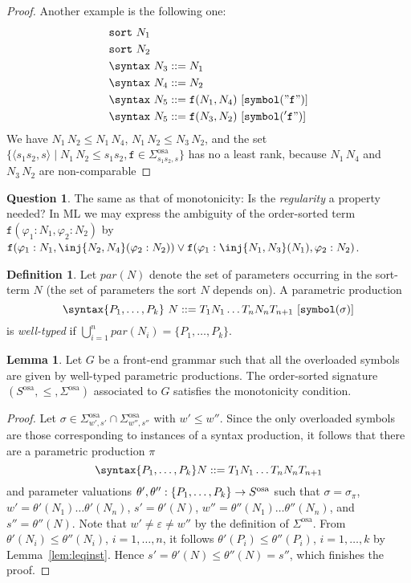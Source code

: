 \documentclass{article}
\theoremstyle{definition}
\theoremstyle{definition}
\theoremstyle{definition}
\newtheorem{definition}{Definition}[section]
\theoremstyle{definition}
\theoremstyle{definition}
\newtheorem{question}{Question}[section]
\theoremstyle{theorem}
\theoremstyle{theorem}
\theoremstyle{theorem}
\newtheorem{lemma}{Lemma}[section]
\theoremstyle{theorem}
\theoremstyle{theorem}
\newcommand{\KWsymbol}{\texttt{symbol}}
\newcommand{\sort}{\texttt{sort}}
\begin{document}
{\begin{proof}
Another example is the following one:
\begin{align*}
&\sort\ N_1\\
&\sort\ N_2\\
&\syntax\ N_3 ::= N_1\\
&\syntax\ N_4 ::= N_2\\
&\syntax\ N_5 ::= \texttt{f}(N_1,N_4)\ [\KWsymbol("\texttt{f}")]\\ 
&\syntax\ N_5 ::= \texttt{f}(N_3,N_2)\ [\KWsymbol('\texttt{f}")]
\end{align*}
We have $N_1\,N_2\le N_1\,N_4$, $N_1\,N_2\le N_3\,N_2$, and the set $\{\langle s_1s_2,s\rangle\mid N_1\,N_2\le s_1s_2, \texttt{f}\in\Sigma^\textrm{osa}_{s_1s_2,s}\}$ has no a least rank, because $N_1\,N_4$ and $N_3\,N_2$ are non-comparable
\end{proof}
\begin{question}
The same as that of monotonicity:
Is the \emph{regularity} a property needed? In ML we may express the ambiguity of the order-sorted term $\texttt{f}(\varphi_1:N_1,\varphi_2:N_2)$ by $\texttt{f}(\varphi_1:N_1,\inj\{N_2,N_4\}(\varphi_2:N_2))\lor\texttt{f}(\varphi_1:\inj\{N_1,N_3\}(N_1),\varphi_2:N_2)$.
\end{question}

\begin{definition}
Let $\mathit{par}(N)$ denote the set of parameters occurring in the sort-term $N$ (the set of parameters the sort $N$ depends on). 
A parametric production
\[\syntax\{P_1,\ldots,P_k\}\ N ::= T_1 N_1 \ldots T_n N_n T_{n+1}\ [\KWsymbol(\sigma)]\]
is \emph{well-typed} if $\bigcup_{i=1}^n\mathit{par}(N_i)=\{P_1,\ldots,P_k\}$.
\end{definition}

\begin{lemma}\label{lem:monotonicity}
Let $G$ be a front-end grammar such that all the overloaded symbols are given by well-typed parametric productions. The order-sorted signature $(S^\textrm{osa},\le, \Sigma^\textrm{osa})$ associated to $G$ satisfies the monotonicity condition.
\end{lemma}
\begin{proof}
Let $\sigma\in \Sigma^\textrm{osa}_{w',s'}\cap \Sigma^\textrm{osa}_{w'',s''}$ with $w'\le w''$.
Since the only overloaded symbols are those corresponding to instances of a syntax production, it follows that there are a parametric production $\pi$
\[
    \syntax\{P\sb{1},\ldots,P\sb{k}\} N ::= T\sb{1}N\sb{1}\ldots T\sb{n}N\sb{n}T\sb{n+1} 
\]
and parameter valuations $\theta',\theta'':\{P\sb{1},\ldots,P\sb{k}\}\to S^\textrm{osa}$  such that $\sigma=\sigma_\pi$, $w'=\theta'(N_1)\ldots\theta'(N_n)$, $s'=\theta'(N)$, $w''=\theta''(N_1)\ldots\theta''(N_n)$, and $s''=\theta''(N)$. Note that $w'\not=\varepsilon\not= w''$ by the definition of $\Sigma^\textrm{osa}$. 
From $\theta'(N_i)\le\theta''(N_i)$, $i=1,\ldots,n$, it follows $\theta'(P_i)\le \theta''(P_i)$, $i=1,\ldots,k$ by Lemma~\ref{lem:leqinst}. Hence $s'=\theta'(N)\le \theta''(N)=s''$, which finishes the proof.
\end{proof}

}
\end{document}

